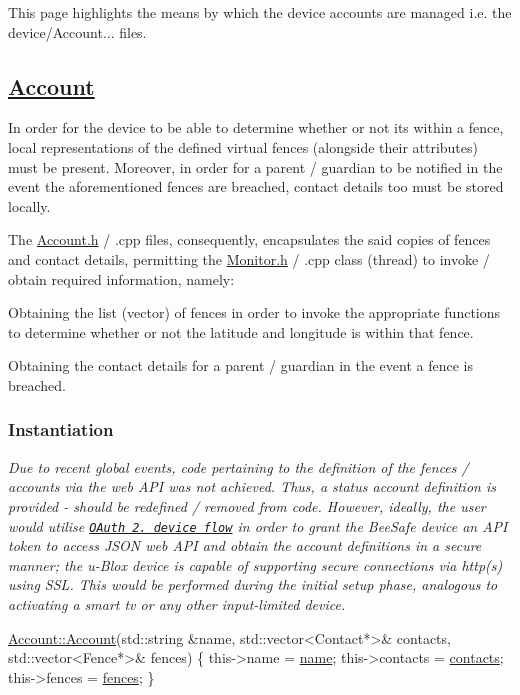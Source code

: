 This page highlights the means by which the device accounts are managed i.\+e. the device/\+Account... files.

\subsection*{\hyperlink{class_account}{Account}}

In order for the device to be able to determine whether or not its within a fence, local representations of the defined virtual fences (alongside their attributes) must be present. Moreover, in order for a parent / guardian to be notified in the event the aforementioned fences are breached, contact details too must be stored locally.

The \hyperlink{_account_8h}{Account.\+h} / .cpp files, consequently, encapsulates the said copies of fences and contact details, permitting the \hyperlink{_monitor_8h}{Monitor.\+h} / .cpp class (thread) to invoke / obtain required information, namely\+:


\begin{DoxyItemize}
\item Obtaining the list (vector) of fences in order to invoke the appropriate functions to determine whether or not the latitude and longitude is within that fence.
\item Obtaining the contact details for a parent / guardian in the event a fence is breached.
\end{DoxyItemize}

\subsubsection*{Instantiation}

{\itshape Due to recent global events, code pertaining to the definition of the fences / accounts via the web A\+PI was not achieved. Thus, a status account definition is provided -\/ should be redefined / removed from code. However, ideally, the user would utilise \href{https://oauth.net/2/device-flow/}{\tt O\+Auth 2. device flow} in order to grant the Bee\+Safe device an A\+PI token to access J\+S\+ON web A\+PI and obtain the account definitions in a secure manner; the u-\/\+Blox device is capable of supporting secure connections via http(s) using S\+SL. This would be performed during the initial setup phase, analogous to activating a smart tv or any other input-\/limited device.}


\begin{DoxyCode}
\hyperlink{class_account_a14f13a7a2e1d69d4b78c804603d69e1b}{Account::Account}(std::string &name, std::vector<Contact*>& contacts,
                 std::vector<Fence*>& fences)
\{
    this->name = \hyperlink{class_account_a586e2c3461c5231eacf7c96851024a75}{name};
    this->contacts = \hyperlink{class_account_aa4f77abd7c44f2a70b0cff8088e3491f}{contacts};
    this->fences = \hyperlink{class_account_ad92a9e8008371f34da06cd416a716fa1}{fences};
\}
\end{DoxyCode}


